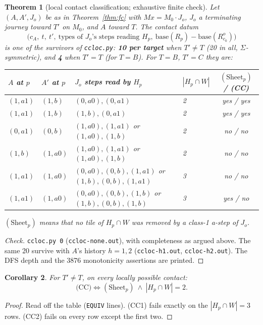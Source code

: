 \documentclass[11pt]{article}
\newtheorem{theorem}{Theorem}\newtheorem{lemma}[theorem]{Lemma}\newtheorem{proposition}[theorem]{Proposition}
\newtheorem{corollary}[theorem]{Corollary}
\theoremstyle{definition}\newtheorem{definition}[theorem]{Definition}\newtheorem{remark}[theorem]{Remark}
\begin{document}
\begin{theorem}[local contact classification; exhaustive finite check]\label{thm:local}
Let $(A,A',J_o)$ be as in Theorem~\ref{thm:fc} with $Mx=M_0\cdot J_o$, $J_o$ a terminating journey toward $T'$ on $M_0$, and $A$ toward $T$. The contact datum
\[\bigl(c_A,\ t,\ t',\ \text{types of }J_o\text{'s steps reading }H_p,\ \mathrm{base}(R_p)-\mathrm{base}(R^o_{c_0})\bigr)\]
is one of the survivors of \texttt{ccloc.py}: \textbf{10 per target} when $T'\ne T$ (20 in all, $\Sigma$-symmetric), and \textbf{4} when $T'=T$ (for $T=B$). For $T=B$, $T'=C$ they are:
\begin{center}\small\begin{tabular}{llllc}\toprule
$A$ at $p$ & $A'$ at $p$ & $J_o$ steps read by $H_p$ & $|H_p\cap W|$ & $(\mathrm{Sheet}_p)$ / (CC)\\\midrule
$(1,a1)$ & $(1,b)$ & $(0,a0),(0,a1)$ & 2 & yes / yes\\
$(1,a1)$ & $(1,b)$ & $(1,b),(0,a1)$ & 2 & yes / yes\\
$(0,a1)$ & $(0,b)$ & $(1,a0),(1,a1)$ or $(1,a0),(1,b)$ & 2 & no / no\\
$(1,b)$ & $(1,a0)$ & $(1,a0),(1,a1)$ or $(1,a0),(1,b)$ & 2 & no / no\\
$(1,a1)$ & $(1,a0)$ & $(0,a0),(0,b),(1,a1)$ or $(1,b),(0,b),(1,a1)$ & 3 & no / no\\
$(1,a1)$ & $(1,a0)$ & $(0,a0),(0,b),(1,b)$ or $(1,b),(0,b),(1,b)$ & 3 & yes / no\\\bottomrule
\end{tabular}\end{center}
$(\mathrm{Sheet}_p)$ means that no tile of $H_p\cap W$ was removed by a class-1 a-step of $J_o$.
\end{theorem}
\begin{proof}[Check]
\texttt{ccloc.py 0} (\texttt{ccloc-none.out}), with completeness as argued above. The same 20 survive with $A$'s history $h=1,2$ (\texttt{ccloc-h1.out}, \texttt{ccloc-h2.out}). The DFS depth and the 3876 monotonicity assertions are printed.
\end{proof}

\begin{corollary}\label{cor:equiv}
For $T'\ne T$, on every locally possible contact:
\[\text{(CC)}\iff(\mathrm{Sheet}_p)\ \wedge\ |H_p\cap W|=2.\]
\end{corollary}
\begin{proof}
Read off the table (\texttt{EQUIV} lines). (CC1) fails exactly on the $|H_p\cap W|=3$ rows. (CC2) fails on every row except the first two.
\end{proof}
\end{document}

